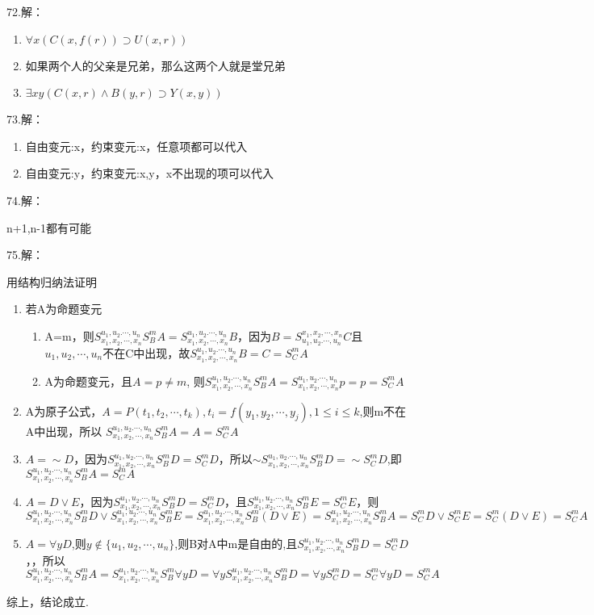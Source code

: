 \documentclass[a4paper]{ctexart}
\begin{document}
\noindent 72.解：
\begin{enumerate}
  \item $\forall{x}(C(x,f(r))\supset U(x,r))$
  \item 如果两个人的父亲是兄弟，那么这两个人就是堂兄弟
  \item $\exists{xy}(C(x,r)\wedge B(y,r)\supset Y(x,y))$
\end{enumerate}

\noindent 73.解：
\begin{enumerate}
  \item 自由变元:x，约束变元:x，任意项都可以代入
  \item 自由变元:y，约束变元:x,y，x不出现的项可以代入
\end{enumerate}

\noindent 74.解：

n+1,n-1都有可能

\noindent 75.解：

用结构归纳法证明
\begin{enumerate}
  \item 若A为命题变元
  \begin{enumerate}
    \item A=m，则$S^{u_1,u_2.\cdots,u_n}_{x_1,x_2,\cdots,x_n}S^m_BA=S^{u_1,u_2.\cdots,u_n}_{x_1,x_2,\cdots,x_n}B$，因为$B=S_{u_1,u_2.\cdots,u_n}^{x_1,x_2,\cdots,x_n}C$且${u_1,u_2,\cdots,u_n}$不在C中出现，故$S^{u_1,u_2.\cdots,u_n}_{x_1,x_2,\cdots,x_n}B=C=S_C^mA$
    \item A为命题变元，且$A=p\neq m$, 则$S^{u_1,u_2.\cdots,u_n}_{x_1,x_2,\cdots,x_n}S^m_BA=S^{u_1,u_2.\cdots,u_n}_{x_1,x_2,\cdots,x_n}p=p=S_C^mA$
  \end{enumerate}
  \item A为原子公式，$A=P(t_1,t_2,\cdots,t_k),t_i=f(y_1,y_2,\cdots,y_j),1\leq i\leq k$,则m不在A中出现，所以 $S^{u_1,u_2.\cdots,u_n}_{x_1,x_2,\cdots,x_n}S^m_BA=A=S_C^mA$
  \item $A=\sim D$，因为$S^{u_1,u_2.\cdots,u_n}_{x_1,x_2,\cdots,x_n}S^m_BD=S_C^mD$，所以$\sim S^{u_1,u_2.\cdots,u_n}_{x_1,x_2,\cdots,x_n}S^m_BD=\sim S_C^mD$,即$S^{u_1,u_2.\cdots,u_n}_{x_1,x_2,\cdots,x_n}S^m_BA=S_C^mA$
  \item $A=D\vee E$，因为$S^{u_1,u_2.\cdots,u_n}_{x_1,x_2,\cdots,x_n}S^m_BD=S_C^mD$，且$S^{u_1,u_2.\cdots,u_n}_{x_1,x_2,\cdots,x_n}S^m_BE=S_C^mE$，则$S^{u_1,u_2.\cdots,u_n}_{x_1,x_2,\cdots,x_n}S^m_BD\vee S^{u_1,u_2.\cdots,u_n}_{x_1,x_2,\cdots,x_n}S^m_BE=S^{u_1,u_2.\cdots,u_n}_{x_1,x_2,\cdots,x_n}S^m_B( D\vee E ) =S^{u_1,u_2.\cdots,u_n}_{x_1,x_2,\cdots,x_n}S^m_BA=S_C^mD \vee S_C^mE=S_C^m(D \vee E)=S_C^mA$
  \item $A=\forall{y}D$,则$y\not\in\{u_1,u_2,\cdots,u_n\}$,则B对A中m是自由的,且$S^{u_1,u_2.\cdots,u_n}_{x_1,x_2,\cdots,x_n}S^m_BD=S_C^mD$，，所以$S^{u_1,u_2.\cdots,u_n}_{x_1,x_2,\cdots,x_n}S^m_BA=S^{u_1,u_2.\cdots,u_n}_{x_1,x_2,\cdots,x_n}S^m_B\forall{y}D=\forall{y}S^{u_1,u_2.\cdots,u_n}_{x_1,x_2,\cdots,x_n}S^m_BD=\forall{y}S_C^mD=S_C^m\forall{y}D=S_C^mA$
\end{enumerate}
综上，结论成立.\newline
\end{document}
